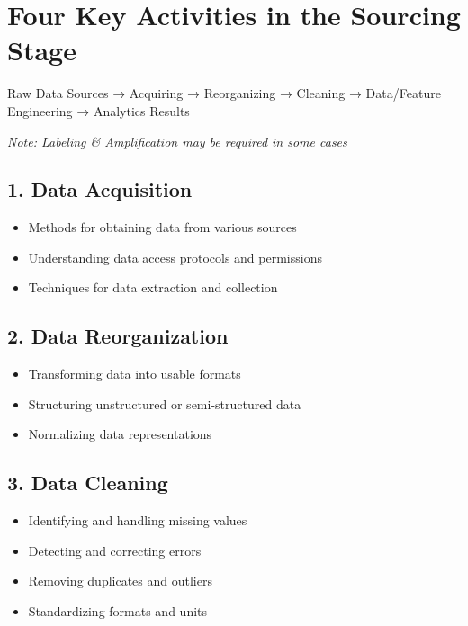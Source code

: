 \documentclass[12pt]{article}
\begin{document}
\section{Four Key Activities in the Sourcing Stage}

\begin{tcolorbox}[colback=green!5!white,colframe=green!75!black,title=Sourcing Process Flow]
Raw Data Sources → Acquiring → Reorganizing → Cleaning → Data/Feature Engineering → Analytics Results

\textit{Note: Labeling \& Amplification may be required in some cases}
\end{tcolorbox}

\subsection{1. Data Acquisition}
\begin{itemize}
    \item Methods for obtaining data from various sources
    \item Understanding data access protocols and permissions
    \item Techniques for data extraction and collection
\end{itemize}

\subsection{2. Data Reorganization}
\begin{itemize}
    \item Transforming data into usable formats
    \item Structuring unstructured or semi-structured data
    \item Normalizing data representations
\end{itemize}

\subsection{3. Data Cleaning}
\begin{itemize}
    \item Identifying and handling missing values
    \item Detecting and correcting errors
    \item Removing duplicates and outliers
    \item Standardizing formats and units
\end{itemize}
\end{document}
